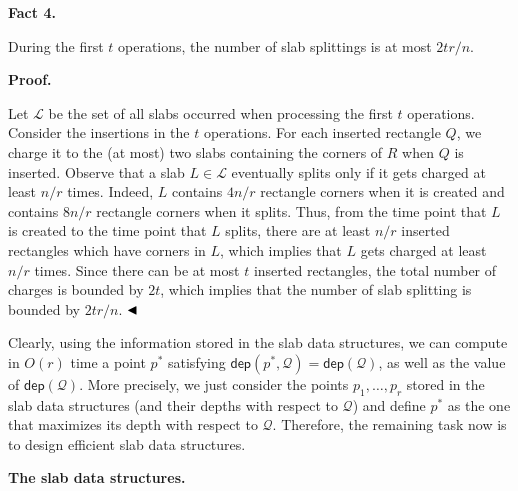 \documentclass[10pt,a4paper]{article}
\begin{document}
\par
\par
\par\medskip\noindent\textbf{Fact 4.}\par
During the first $t$ operations, the number of slab splittings is at most $2tr/n$.
\par
\par
\par
\par\medskip\noindent\textbf{Proof.}\par
Let $\mathcal{L}$ be the set of all slabs occurred when processing the first $t$ operations. Consider the insertions in the $t$ operations. For each inserted rectangle $Q$, we charge it to the (at most) two slabs containing the corners of $R$ when $Q$ is inserted. Observe that a slab $L\in\mathcal{L}$ eventually splits only if it gets charged at least $n/r$ times. Indeed, $L$ contains $4n/r$ rectangle corners when it is created and contains $8n/r$ rectangle corners when it splits. Thus, from the time point that $L$ is created to the time point that $L$ splits, there are at least $n/r$ inserted rectangles which have corners in $L$, which implies that $L$ gets charged at least $n/r$ times. Since there can be at most $t$ inserted rectangles, the total number of charges is bounded by $2t$, which implies that the number of slab splitting is bounded by $2tr/n$. $\hfill\blacktriangleleft$
\par
\par
Clearly, using the information stored in the slab data structures, we can compute in $O(r)$ time a point $p^{*}$ satisfying $\mathsf{dep}(p^{*},\mathcal{Q})=\mathsf{dep}(\mathcal{Q})$, as well as the value of $\mathsf{dep}(\mathcal{Q})$. More precisely, we just consider the points $p_{1},\dots,p_{r}$ stored in the slab data structures (and their depths with respect to $\mathcal{Q}$) and define $p^{*}$ as the one that maximizes its depth with respect to $\mathcal{Q}$. Therefore, the remaining task now is to design efficient slab data structures.
\par
\par
\par\medskip\noindent\textbf{The slab data structures.}\par
\end{document}

